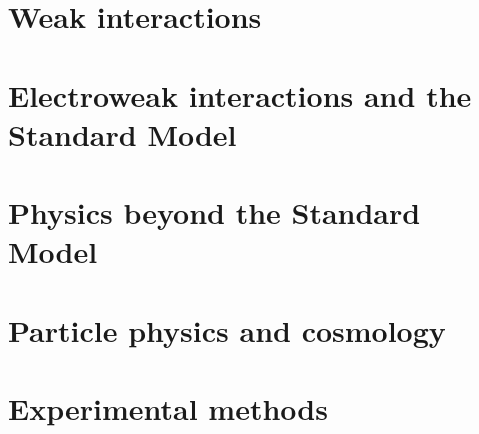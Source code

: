 \documentclass[en, device=normal]{elegantnote}
\begin{document}
\section{Weak interactions}

\section{Electroweak interactions and the Standard Model}

\section{Physics beyond the Standard Model}

\section{Particle physics and cosmology}

\section{Experimental methods}
\end{document}
